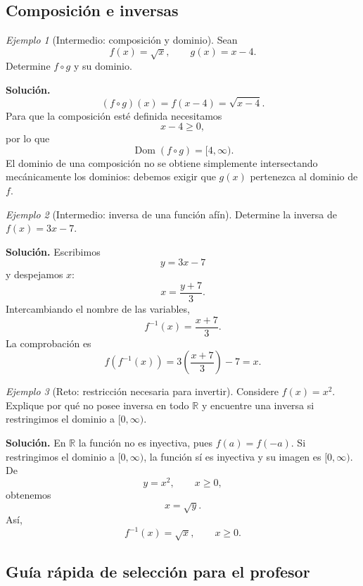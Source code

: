 \documentclass[12pt]{article}
\theoremstyle{remark}
\newtheorem{ejemplo}{Ejemplo}[section]
\newcommand{\R}{\mathbb{R}}
\newcommand{\Dom}{\operatorname{Dom}}
\begin{document}
\subsection{Composición e inversas}

\begin{ejemplo}[Intermedio: composición y dominio]
Sean
\[
f(x)=\sqrt{x},\qquad g(x)=x-4.
\]
Determine $f\circ g$ y su dominio.

\textbf{Solución.}
\[
(f\circ g)(x)=f(x-4)=\sqrt{x-4}.
\]
Para que la composición esté definida necesitamos
\[
x-4\ge0,
\]
por lo que
\[
\boxed{\Dom(f\circ g)=[4,\infty)}.
\]
El dominio de una composición no se obtiene simplemente intersectando mecánicamente los dominios: debemos exigir que $g(x)$ pertenezca al dominio de $f$.
\end{ejemplo}

\begin{ejemplo}[Intermedio: inversa de una función afín]
Determine la inversa de $f(x)=3x-7$.

\textbf{Solución.} Escribimos
\[
y=3x-7
\]
y despejamos $x$:
\[
x=\frac{y+7}{3}.
\]
Intercambiando el nombre de las variables,
\[
\boxed{f^{-1}(x)=\frac{x+7}{3}}.
\]
La comprobación es
\[
f(f^{-1}(x))=3\left(\frac{x+7}{3}\right)-7=x.
\]
\end{ejemplo}

\begin{ejemplo}[Reto: restricción necesaria para invertir]
Considere $f(x)=x^2$. Explique por qué no posee inversa en todo $\R$ y encuentre una inversa si restringimos el dominio a $[0,\infty)$.

\textbf{Solución.} En $\R$ la función no es inyectiva, pues $f(a)=f(-a)$. Si restringimos el dominio a $[0,\infty)$, la función sí es inyectiva y su imagen es $[0,\infty)$. De
\[
y=x^2,\qquad x\ge0,
\]
obtenemos
\[
x=\sqrt{y}.
\]
Así,
\[
\boxed{f^{-1}(x)=\sqrt{x},\qquad x\ge0}.
\]
\end{ejemplo}

\subsection{Guía rápida de selección para el profesor}
\end{document}

